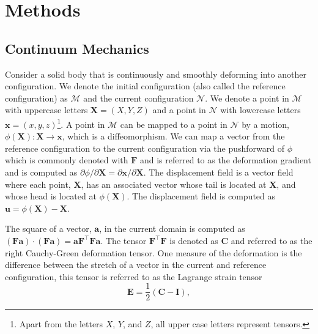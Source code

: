 \section{Methods}
\subsection{Continuum Mechanics}
Consider a solid body that is continuously and smoothly deforming into another configuration. We denote the initial configuration (also called the reference configuration) as $\mathcal{M}$ and the current configuration $\mathcal{N}$. We denote a point in $\mathcal{M}$ with uppercase letters $\mathbf{X} = (X, Y, Z)$ and a point in $\mathcal{N}$ with lowercase letters $\mathbf{x} = (x, y, z)$\footnote{Apart from the letters $X$, $Y$, and $Z$, all upper case letters represent tensors.}. A point in $\mathcal{M}$ can be mapped to a point in $\mathcal{N}$ by a motion, $\phi(\mathbf{X}): \mathbf{X} \rightarrow \mathbf{x}$, which is a diffeomorphism. We can map a vector from the reference configuration to the current configuration via the pushforward of $\phi$ which is commonly denoted with $\mathbf{F}$ and is referred to as the deformation gradient and is computed as $\partial\phi/\partial\mathbf{X} = \partial\mathbf{x}/\partial\mathbf{X}$. The displacement field is a vector field where each point, $\mathbf{X}$, has an associated  vector whose tail is located at $\mathbf{X}$, and whose head is located at $\phi(\mathbf{X})$. The displacement field is computed as $\mathbf{u} = \phi(\mathbf{X}) - \mathbf{X}$. \par 
The square of a vector, $\mathbf{a}$, in the current domain is computed as $(\mathbf{Fa})\cdot(\mathbf{Fa}) = \mathbf{a}\mathbf{F}^\top\mathbf{F}\mathbf{a}$. The tensor $\mathbf{F}^\top\mathbf{F}$ is denoted as $\mathbf{C}$ and referred to as the right Cauchy-Green deformation tensor. One measure of the deformation is the difference between the stretch of a vector in the current and reference configuration, this tensor is referred to as the Lagrange strain tensor 
\begin{equation*}
    \mathbf{E} = \frac{1}{2}\left(\mathbf{C} - \mathbf{I}\right),
\end{equation*}
